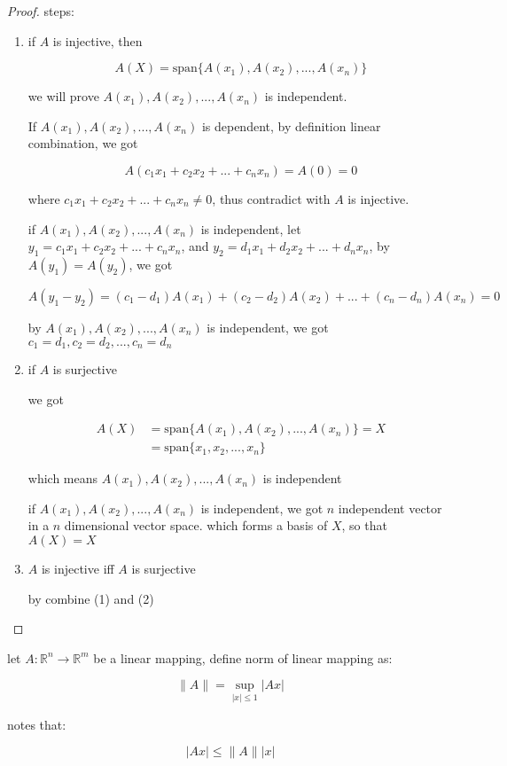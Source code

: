 \begin{proof}
    steps:

    \begin{enumerate}
        \item if $A$ is injective, then

        \[
            A(X) = \mathrm{span} \{ A(x_1), A(x_2), ..., A(x_n)\}
        \]

        we will prove $A(x_1),A(x_2),...,A(x_n)$ is independent. 

        If $A(x_1),A(x_2),...,A(x_n)$ is dependent, by definition linear combination,
        we got 
        
        \[
        A(c_1x_1+c_2x_2+...+c_nx_n) = A(0) = 0
        \]

        where $c_1x_1+c_2x_2+...+c_nx_n \ne 0$, thus contradict with $A$ is injective.

        if $A(x_1), A(x_2), ..., A(x_n)$ is independent, let $y_1 = c_1x_1 + c_2x_2 + ... + c_nx_n$, and
        $y_2 = d_1x_1 + d_2x_2 + ... + d_nx_n$, by $A(y_1) = A(y_2)$, we got 
        
        \[
            A(y_1-y_2) = (c_1-d_1)A(x_1) + (c_2-d_2)A(x_2) + ... + (c_n-d_n)A(x_n) = 0
        \]

        by $A(x_1), A(x_2), ...,A(x_n)$ is independent, we got $c_1 = d_1,c_2=d_2,...,c_n = d_n$
        

        \item if $A$ is surjective
        
        we got

        \begin{align*}
            A(X) &= \mathrm{span} \{ A(x_1), A(x_2), ..., A(x_n)\} = X \\
            &= \mathrm{span} \{ x_1,x_2,...,x_n \}
        \end{align*}

        which means $A(x_1), A(x_2), ..., A(x_n)$ is independent

        if $A(x_1), A(x_2), ..., A(x_n)$ is independent, we got $n$ independent vector in a $n$ dimensional vector space.
        which forms a basis of $X$, so that $A(X) = X$

        \item $A$ is injective iff $A$ is surjective

        by combine (1) and (2)
    \end{enumerate}
\end{proof}


\begin{definition}
    let $A: \mathbb{R}^n \to \mathbb{R}^m$ be a linear mapping, define norm of linear mapping as:
    
    \[
        \| A\| = \sup_{|x| \le 1} \left| Ax \right|
    \]

    notes that:

    \[
\left| Ax \right| \le \| A \| |x|
    \]
\end{definition}

